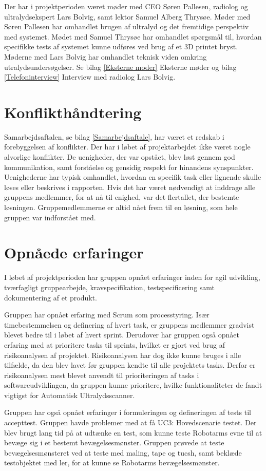 Der har i projektperioden været møder med CEO Søren Pallesen, radiolog og ultralydsekspert Lars Bolvig, samt lektor Samuel Alberg Thrysøe. Møder med Søren Pallesen har omhandlet brugen af ultralyd og det fremtidige perspektiv med systemet. Mødet med Samuel Thrysøe har omhandlet spørgsmål til, hvordan specifikke tests af systemet kunne udføres ved brug af et 3D printet bryst. Møderne med Lars Bolvig har omhandlet teknisk viden omkring utralydsundersøgelser. Se bilag \ref{Eksterne moder} Eksterne møder og bilag \ref{Telefoninterview} Interview med radiolog Lars Bolvig. 

\section{Konflikthåndtering}
Samarbejdsaftalen, se bilag \ref{Samarbejdsaftale}, har været et redskab i forebyggelsen af konflikter. Der har i løbet af projektarbejdet ikke været nogle alvorlige konflikter. De uenigheder, der var opstået, blev løst gennem god kommunikation, samt forståelse og gensidig respekt for hinandens synspunkter. Uenighederne har typisk omhandlet, hvordan en specifik task eller lignende skulle løses eller beskrives i rapporten. Hvis det har været nødvendigt at inddrage alle gruppens medlemmer, for at nå til enighed, var det flertallet, der bestemte løsningen. Gruppemedlemmerne er altid nået frem til en løsning, som hele gruppen var indforstået med.

\section{Opnåede erfaringer}
I løbet af projektperioden har gruppen opnået erfaringer inden for agil udvikling, tværfagligt gruppearbejde, kravspecifikation, testspecificering samt dokumentering af et produkt.

Gruppen har opnået erfaring med Scrum som processtyring. Især timebestemmelsen og definering af hvert task, er gruppens medlemmer gradvist blevet bedre til i løbet af hvert sprint. Derudover har gruppen også opnået erfaring med at prioritere tasks til sprints, hvilket er gjort ved brug af risikoanalysen af projektet. Risikoanalysen har dog ikke kunne bruges i alle tilfælde, da den blev lavet før gruppen kendte til alle projektets tasks. Derfor er risikoanalysen mest blevet anvendt til prioriteringen af tasks i softwareudviklingen, da gruppen kunne prioritere, hvilke funktionaliteter de fandt vigtigst for Automatisk Ultralydsscanner. 

Gruppen har også opnået erfaringer i formuleringen og defineringen af tests til accepttest. Gruppen havde problemer med at få UC3: Hovedscenarie testet. Der blev brugt lang tid på at udtænke en test, som kunne teste Robotarms evne til at bevæge sig i et bestemt bevægelsesmønster. Gruppen prøvede at teste bevægelsesmønsteret ved at teste med maling, tape og tucsh, samt beklæde testobjektet med ler, for at kunne se Robotarms bevægelsesmønster. 

